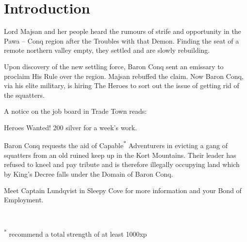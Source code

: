 
\section*{Introduction}
Lord Majsan and her people heard the rumours of strife and opportunity in the Pawa -- Conq region after the Troubles with that Demon. Finding the seat of a remote northern valley empty, they settled and are slowly rebuilding.

Upon discovery of the new settling force, Baron Conq sent an emissary to proclaim His Rule over the region. Majsan rebuffed the claim. Now Baron Conq, via his elite military, is hiring The Heroes to sort out the issue of getting rid of the squatters.

\vspace{1.0\baselineskip}


\noindent\begin{minipage}{\textwidth}
\noindent A notice on the job board in Trade Town reads:


\begin{readoutloud}
Heroes Wanted! 200 silver for a week's work.

Baron Conq requests the aid of Capable\textsuperscript{*} Adventurers in evicting a gang of squatters from an old ruined keep up in the Kort Mountains. Their leader has refused to kneel and pay tribute and is therefore illegally occupying land which by King's Decree falls under the Domain of Baron Conq.

Meet Captain Lundqvist in Sleepy Cove for more information and your Bond of Employment.

\

\noindent
\textsuperscript{*} \small recommend a total strength of at least 1000xp \normalsize
\end{readoutloud}
\end{minipage}

